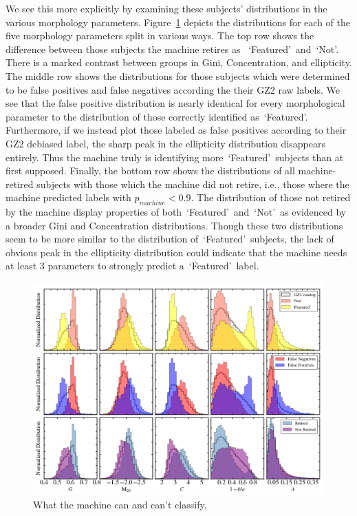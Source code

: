 \documentclass[twocolumn]{aastex6}
\newcommand{\feat}{`Featured'}
\newcommand{\notfeat}{`Not'}
\begin{document}
We  see this more explicitly by examining these subjects' distributions in the 
various morphology parameters. Figure~\ref{fig: morph params} depicts the 
distributions for each of the five morphology parameters split in various ways. 
The top row shows the difference between those subjects the machine retires as
~\feat~and~\notfeat. There is a marked contrast between groups in Gini, Concentration,
and ellipticity. The middle row shows the distributions for those subjects which 
were determined to be false positives and false negatives according the their GZ2 
raw labels. We see that the false positive distribution is nearly identical for every 
morphological parameter to the distribution of those correctly identified as~\feat. 
Furthermore, if we instead plot those labeled as false positives 
according to their GZ2 debiased label, the sharp peak in the ellipticity distribution 
disappears entirely. Thus the machine truly is identifying more~\feat~subjects than
at first supposed. Finally, the bottom row shows the distributions of all machine-retired
subjects with those which the machine did not retire, i.e., those where the machine 
predicted labels with $p_{machine}<0.9$. The distribution of those not retired by the machine
display properties of both~\feat~and~\notfeat~as evidenced by a broader Gini and
Concentration distributions. Though these two distributions seem to be more similar
to the distribution of~\feat~subjects, the lack of obvious peak in the ellipticity distribution 
could indicate that the machine needs at least 3 parameters to strongly predict a~\feat~label.


\begin{figure}[t!]
\centering
\includegraphics[width=7in]{figures/GZ2_sup_PLPD5_p5_flipfeature2b_RF_accuracy_redo_raw_combo_morph_params_raw_labels_4paper.png}
\caption{What the machine can and can't classify. \label{fig: morph params}}
\end{figure}
\end{document}
